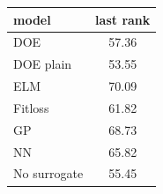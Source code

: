 \begin{tabular}{|lc|}
\hline
model & last rank\\
\hline
DOE & 57.36 \\
DOE plain & 53.55 \\
ELM & 70.09 \\
Fitloss & 61.82 \\
GP & 68.73 \\
NN & 65.82 \\
No surrogate & 55.45 \\
\hline
\end{tabular}
